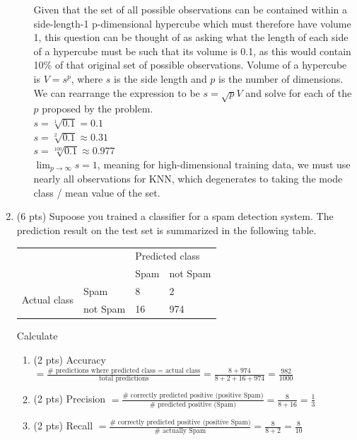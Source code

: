 \documentclass[a4paper]{article}
\theoremstyle{definition}
\newenvironment{soln}{
    \leavevmode\color{blue}\ignorespaces
}{}
\begin{document}
\begin{enumerate}
\begin{enumerate}
	\begin{soln}  
            Given that the set of all possible observations can be contained within a side-length-1 p-dimensional hypercube which must therefore have volume 1, this question can be thought of as asking what the length of each side of a hypercube must be such that its volume is 0.1, as this would contain 10\% of that original set of possible observations.
            Volume of a hypercube is $V = s^{p}$, where $s$ is the side length and $p$ is the number of dimensions. We can rearrange the expression to be $s = \sqrt{p}{V}$ and solve for each of the $p$ proposed by the problem.
            \\$s = \sqrt[1]{0.1} = 0.1$
            \\$s = \sqrt[2]{0.1} \approx 0.31$
            \\$s = \sqrt[100]{0.1} \approx 0.977$
            \\$\lim_{{p \to \infty}} s = 1$, meaning for high-dimensional training data, we must use nearly all observations for KNN, which degenerates to taking the mode class / mean value of the set. 
        \end{soln}
	
\end{enumerate}

\item (6 pts) Supoose you trained a classifier for a spam detection system. The prediction result on the test set is summarized in the following table.
\begin{center}
	\begin{tabular}{l l | l l}
		&          & \multicolumn{2}{l}{Predicted class} \\
		&          & Spam           & not Spam           \\
		\hline
		\multirow{2}{*}{Actual class} & Spam     & 8              & 2                  \\
		& not Spam & 16             & 974               
	\end{tabular}
\end{center}

Calculate
\begin{enumerate}
	\item (2 pts) Accuracy
	\begin{soln}  $ = \frac{\text{# predictions where predicted class = actual class}}{\text{total predictions}} = \frac{8 + 974}{8+2+16+974} = \frac{982}{1000}$ \end{soln}
	\item (2 pts) Precision
	\begin{soln}  $ = \frac{\text{# correctly predicted positive (positive Spam)}}{\text{# predicted positive (Spam)}} = \frac{8}{8+16} = \frac{1}{3}$ \end{soln}
	\item (2 pts) Recall
	\begin{soln}  $ = \frac{\text{# correctly predicted positive (positive Spam)}}{\text{# actually Spam}} = \frac{8}{8+2} = \frac{8}{10}$ \end{soln}
\end{enumerate}



\end{enumerate}
\end{document}
